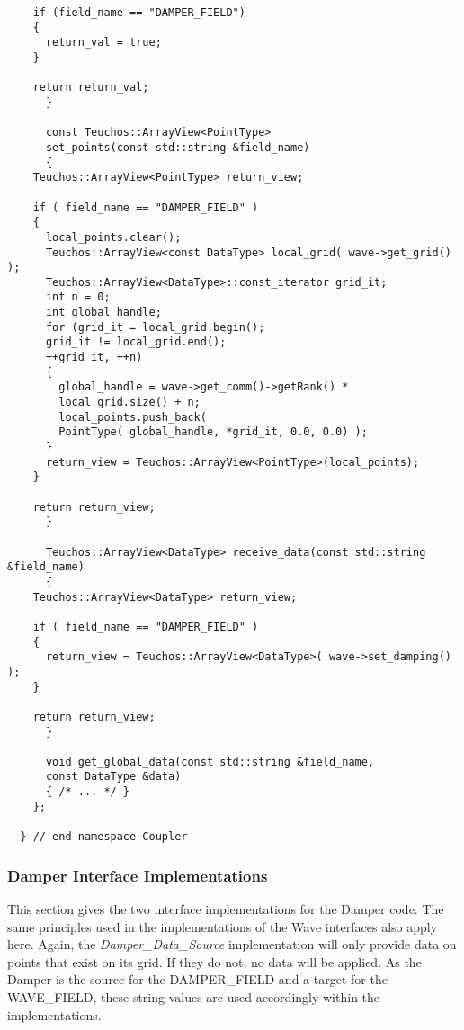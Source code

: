 \documentclass[letterpaper]{article}
\begin{document}
\begin{lstlisting}
	if (field_name == "DAMPER_FIELD")
	{
	  return_val = true;
	}

	return return_val;
      }

      const Teuchos::ArrayView<PointType> 
      set_points(const std::string &field_name)
      {
	Teuchos::ArrayView<PointType> return_view;

	if ( field_name == "DAMPER_FIELD" )
	{
	  local_points.clear();
	  Teuchos::ArrayView<const DataType> local_grid( wave->get_grid() );
	  Teuchos::ArrayView<DataType>::const_iterator grid_it;
	  int n = 0;
	  int global_handle;
	  for (grid_it = local_grid.begin(); 
	  grid_it != local_grid.end();
	  ++grid_it, ++n)
	  {
	    global_handle = wave->get_comm()->getRank() *
	    local_grid.size() + n;
	    local_points.push_back( 
	    PointType( global_handle, *grid_it, 0.0, 0.0) );
	  }
	  return_view = Teuchos::ArrayView<PointType>(local_points);
	}

	return return_view;
      }

      Teuchos::ArrayView<DataType> receive_data(const std::string &field_name)
      {
	Teuchos::ArrayView<DataType> return_view;

	if ( field_name == "DAMPER_FIELD" )
	{
	  return_view = Teuchos::ArrayView<DataType>( wave->set_damping() );
	}

	return return_view;
      }

      void get_global_data(const std::string &field_name,
      const DataType &data)
      { /* ... */ }
    };

  } // end namespace Coupler
\end{lstlisting}

\subsubsection{Damper Interface Implementations}
This section gives the two interface implementations for the Damper
code. The same principles used in the implementations of the Wave
interfaces also apply here. Again, the {\sl Damper\_Data\_Source}
implementation will only provide data on points that exist on its
grid. If they do not, no data will be applied. As the Damper is the
source for the DAMPER\_FIELD and a target for the WAVE\_FIELD, these
string values are used accordingly within the implementations.
\end{document}
